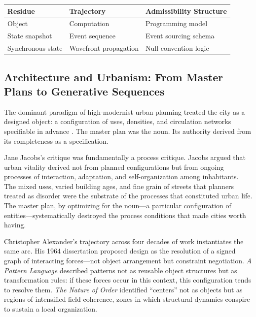 \documentclass[12pt, a4paper]{article}
\theoremstyle{plain}
\theoremstyle{definition}
\theoremstyle{remark}
\begin{document}
\begin{center}
\begin{tabular}{lll}
\toprule
\textbf{Residue} & \textbf{Trajectory} & \textbf{Admissibility Structure} \\
\midrule
Object & Computation & Programming model \\
State snapshot & Event sequence & Event sourcing schema \\
Synchronous state & Wavefront propagation & Null convention logic \\
\bottomrule
\end{tabular}
\end{center}

\subsection{Architecture and Urbanism: From Master Plans to Generative Sequences}

The dominant paradigm of high-modernist urban planning treated the city as
a designed object: a configuration of uses, densities, and circulation
networks specifiable in advance \citep{scott1998}. The master plan was the
noun. Its authority derived from its completeness as a specification.

Jane Jacobs's critique \citep{jacobs1961} was fundamentally a process
critique. Jacobs argued that urban vitality derived not from planned
configurations but from ongoing processes of interaction, adaptation, and
self-organization among inhabitants. The mixed uses, varied building ages,
and fine grain of streets that planners treated as disorder were the substrate
of the processes that constituted urban life. The master plan, by optimizing
for the noun---a particular configuration of entities---systematically
destroyed the process conditions that made cities worth having.

Christopher Alexander's trajectory across four decades of work instantiates
the same arc. His 1964 dissertation \citep{alexander1964} proposed design as
the resolution of a signed graph of interacting forces---not object arrangement
but constraint negotiation. \emph{A Pattern Language} \citep{alexander1977}
described patterns not as reusable object structures but as transformation
rules: if these forces occur in this context, this configuration tends to
resolve them. \emph{The Nature of Order} \citep{alexander2002} identified
``centers'' not as objects but as regions of intensified field coherence,
zones in which structural dynamics conspire to sustain a local organization.
\end{document}
